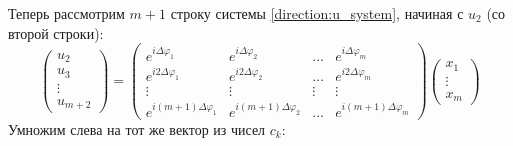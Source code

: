 Теперь рассмотрим $m+1$ строку системы \eqref{direction:u_system}, начиная с $u_2$ (со второй строки):
\[
    \begin{pmatrix}
        u_2    \\
        u_3    \\
        \vdots \\
        u_{m+2}
    \end{pmatrix}
    =
    \begin{pmatrix}
        e^{i \Delta \varphi_1}       & e^{i \Delta \varphi_2}       & \dots  & e^{i \Delta \varphi_m}       \\
        e^{i 2 \Delta \varphi_1}     & e^{i 2 \Delta \varphi_2}     & \dots  & e^{i 2 \Delta \varphi_m}     \\
        \vdots                       & \vdots                       & \vdots & \vdots                       \\
        e^{i (m+1) \Delta \varphi_1} & e^{i (m+1) \Delta \varphi_2} & \dots  & e^{i (m+1) \Delta \varphi_m}
    \end{pmatrix}
    \begin{pmatrix}
        x_1    \\
        \vdots \\
        x_m
    \end{pmatrix}
\]
Умножим слева на тот же вектор из чисел $c_k$:

